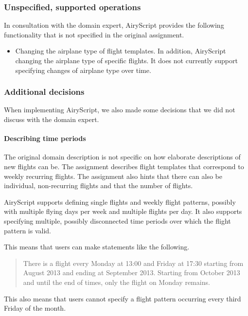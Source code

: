 \subsubsection{Unspecified, supported operations}
\label{sec:unspecified_supported}
In consultation with the domain expert, AiryScript provides the following
functionality that is not specified in the original assignment.
\begin{itemize}
  \item Changing the airplane type of flight templates. In addition, AiryScript
    changing the airplane type of specific flights.
    It does not currently support specifying changes of airplane type over time.    %

\end{itemize}


\subsubsection{Additional decisions}
\label{sec:additional_decisions}
When implementing AiryScript, we also made some decisions that we did not
discuss with the domain expert.

\paragraph{Describing time periods}
The original domain description is not specific on how elaborate
descriptions of new flights can be. The assignment describes flight
templates that correspond to weekly recurring flights. The assignment also
hints that there can also be individual, non-recurring flights and that the
number of flights.

AiryScript supports defining single flights and weekly flight patterns,
possibly with multiple flying days per week and multiple flights per day. It
also supports specifying multiple, possibly disconnected time periods over
which the flight pattern is valid.

This means that users can make statements like the following.
\begin{quote}
  There is a flight every Monday at 13:00 and Friday at 17:30 starting from
  August 2013 and ending at September 2013. Starting from October 2013 and
  until the end of times, only the flight on Monday remains.
\end{quote}
This also means that users cannot specify a flight pattern occurring every
third Friday of the month.


